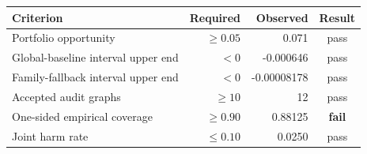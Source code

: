 \begin{tabular}{@{}lrrc@{}}
\toprule
Criterion & Required & Observed & Result \\
\midrule
Portfolio opportunity & $\geq 0.05$ & 0.071 & pass \\
Global-baseline interval upper end & $<0$ & -0.000646 & pass \\
Family-fallback interval upper end & $<0$ & -0.00008178 & pass \\
Accepted audit graphs & $\geq 10$ & 12 & pass \\
One-sided empirical coverage & $\geq 0.90$ & 0.88125 & \textbf{fail} \\
Joint harm rate & $\leq 0.10$ & 0.0250 & pass \\
\bottomrule
\end{tabular}
